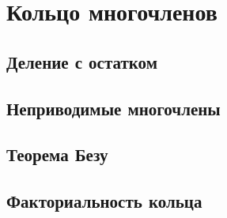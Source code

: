 \section{Кольцо многочленов}
\subsection{Деление с остатком} 

\subsection{Неприводимые многочлены}
\subsection{Теорема Безу}
\subsection{Факториальность кольца}
